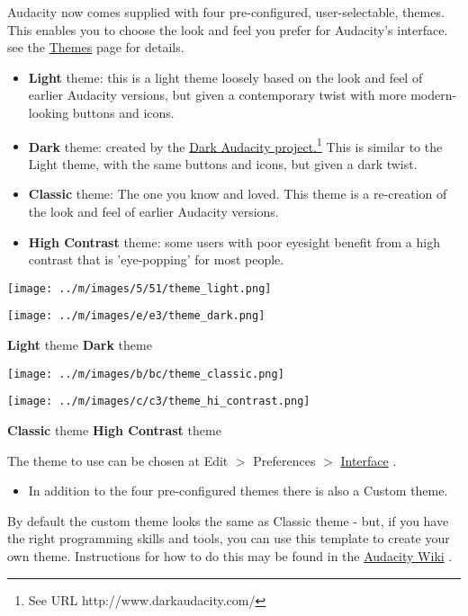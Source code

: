 \documentclass[]{book}
\begin{document}
\begin{multicols}{2}
Audacity now comes supplied with four pre-configured, user-selectable, themes.  This enables you to choose the look and feel you prefer for Audacity's interface. see the 
\hyperref[themes_]{Themes}
 page for details.
\begin{itemize}
\item \textbf{Light} theme: this is a light theme loosely based on the look and feel of earlier Audacity versions, but given a contemporary twist with more modern-looking buttons and icons. 
\item \textbf{Dark} theme: created by the 
\hyperref[http:__www.darkaudacity.com_]{Dark Audacity project.\footnote{See URL http://www.darkaudacity.com/}}
 This is similar to the Light theme, with the same buttons and icons, but given a dark twist.
\item \textbf{Classic} theme: The one you know and loved. This theme is a re-creation of the look and feel of earlier Audacity versions. 
\item \textbf{High Contrast} theme: some users with poor eyesight benefit from a high contrast that is 'eye-popping' for most people.
\end{itemize}



\* \* \* \* \par\texttt{[image: ../m/images/5/51/theme\_light.png]}\par
\* \* \* \* \par\texttt{[image: ../m/images/e/e3/theme\_dark.png]}\par
\* \* \* \* 
\textbf{Light} theme
\* \* \* \* 
\textbf{Dark} theme


\* \* \* \* \par\texttt{[image: ../m/images/b/bc/theme\_classic.png]}\par
\* \* \* \* \par\texttt{[image: ../m/images/c/c3/theme\_hi\_contrast.png]}\par
\* \* \* \* 
\textbf{Classic} theme
\* \* \* \* 
\textbf{High Contrast} theme



The theme to use can be chosen at Edit \mbox{$>$} Preferences \mbox{$>$} 
\hyperref[interface_preferences_]{Interface}
.  
\begin{itemize}
\item  In addition to the four pre-configured themes there is also a Custom theme.  
\end{itemize}
 By default the custom theme looks the same as Classic theme - but, if you have the right programming skills and tools, you can use this template to create your own theme.  Instructions for how to do this may be found in the 
\hyperref[https:__wiki.audacityteam.org_wiki_Theming_HowTo]{Audacity Wiki}
.



\end{multicols}
\end{document}
